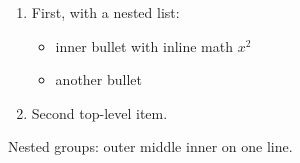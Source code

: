 \begin{enumerate}
  \item First, with a nested list:
    \begin{itemize}
      \item inner bullet with inline math $x^2$
      \item another bullet
    \end{itemize}
  \item Second top-level item.
\end{enumerate}

Nested groups: {outer {middle {inner}}} on one line.
